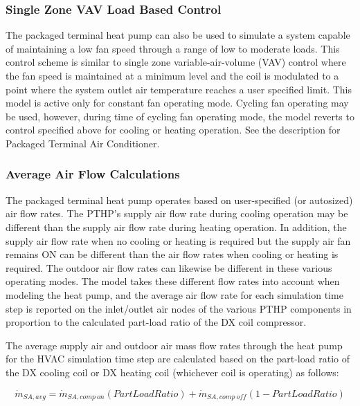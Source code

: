 \subsubsection{Single Zone VAV Load Based Control}\label{single-zone-vav-load-based-control-2}

The packaged terminal heat pump can also be used to simulate a system capable of maintaining a low fan speed 
through a range of low to moderate loads. This control scheme is similar to single zone variable-air-volume (VAV) control where the fan speed is maintained at a minimum level and the coil is modulated to a point where the system outlet air temperature reaches a user specified limit. This model is active only for constant fan operating mode. Cycling fan operating may be used, however, during time of cycling fan operating mode, the model reverts to control specified above for cooling or heating operation. See the description for Packaged Terminal Air Conditioner.

\subsubsection{Average Air Flow Calculations}\label{average-air-flow-calculations-1}

The packaged terminal heat pump operates based on user-specified (or autosized) air flow rates. The PTHP's supply air flow rate during cooling operation may be different than the supply air flow rate during heating operation. In addition, the supply air flow rate when no cooling or heating is required but the supply air fan remains ON can be different than the air flow rates when cooling or heating is required. The outdoor air flow rates can likewise be different in these various operating modes. The model takes these different flow rates into account when modeling the heat pump, and the average air flow rate for each simulation time step is reported on the inlet/outlet air nodes of the various PTHP components in proportion to the calculated part-load ratio of the DX coil compressor.

The average supply air and outdoor air mass flow rates through the heat pump for the HVAC simulation time step are calculated based on the part-load ratio of the DX cooling coil or DX heating coil (whichever coil is operating) as follows:

\begin{equation}
\dot m{_{SA,avg}} = \dot m{_{SA,comp~on}}\left( {PartLoadRatio} \right) + \dot m{_{SA,comp~off}}\left( {1 - PartLoadRatio} \right)
\end{equation}

